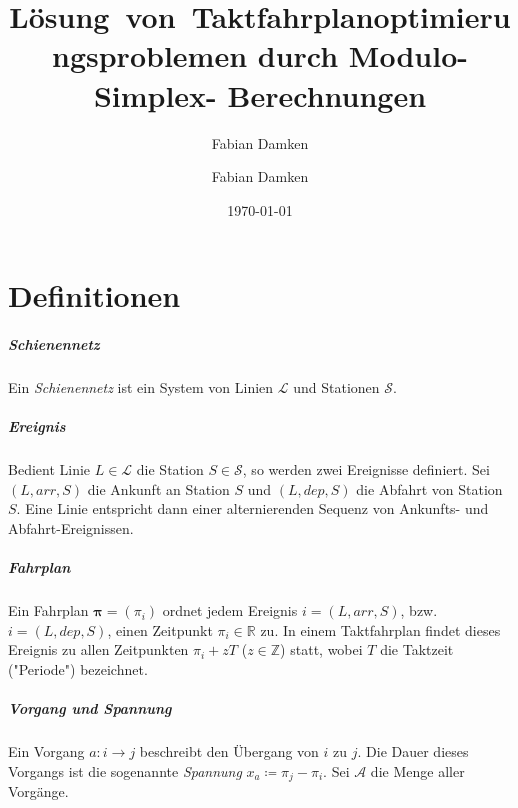\documentclass[accentcolor = tud11b, colorbacktitle, a4paper, 11pt, tudmathserif]{tudexercise}
\title{Lösung~von~Takt\-fahr\-plan\-op\-ti\-mie\-rungs\-pro\-ble\-men durch Mo\-du\-lo-Sim\-plex- Be\-rech\-nung\-en}
\subtitle{Fabian Damken}
\author{Fabian Damken}
\date{\today}
\newcommand{\arr}{\mathit{arr}}
\newcommand{\dep}{\mathit{dep}}
\newcommand{\R}{\ensuremath{\mathbb{R}}}
\newcommand{\Z}{\ensuremath{\mathbb{Z}}}
\renewcommand{\vec}[1]{\boldsymbol{\mathbf{#1}}}
\begin{document}
	

	\maketitle

	\section*{Definitionen}
		\subparagraph{Schienennetz}
		Ein \emph{Schienennetz} ist ein System von Linien \(\mathcal{L}\) und Stationen \(\mathcal{S}\).
	
		\subparagraph{Ereignis}
		Bedient Linie \( L \in \mathcal{L} \) die Station \( S \in \mathcal{S} \), so werden zwei Ereignisse definiert. Sei \( (L, \arr, S) \) die Ankunft an Station \(S\) und \( (L, \dep, S) \) die Abfahrt von Station \(S\). Eine Linie entspricht dann einer alternierenden Sequenz von Ankunfts- und Abfahrt-Ereignissen.
	
		\subparagraph{Fahrplan}
		Ein Fahrplan \( \vec{\pi} = (\pi_i) \) ordnet jedem Ereignis \( i = (L, \arr, S) \), bzw. \( i = (L, \dep, S) \), einen Zeitpunkt \( \pi_i \in \R \) zu. In einem Taktfahrplan findet dieses Ereignis zu allen Zeitpunkten \( \pi_i + z T \) (\( z \in \Z \)) statt, wobei \( T \) die Taktzeit ("Periode") bezeichnet.
		
		\subparagraph{Vorgang und Spannung}
		Ein Vorgang \( a : i \to j \) beschreibt den Übergang von \(i\) zu \(j\). Die Dauer dieses Vorgangs ist die sogenannte \emph{Spannung} \( x_a \coloneqq \pi_j - \pi_i \). Sei \(\mathcal{A}\) die Menge aller Vorgänge.

	
\end{document}
